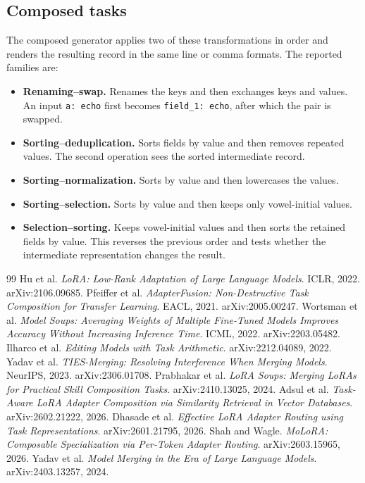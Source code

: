 \documentclass[10pt,twocolumn]{article}
\begin{document}
\subsection{Composed tasks}

The composed generator applies two of these transformations in order and renders the resulting record in the same line or comma formats. The reported families are:
\begin{itemize}
    \item \textbf{Renaming--swap.} Renames the keys and then exchanges keys and values. An input \texttt{a: echo} first becomes \texttt{field\_1: echo}, after which the pair is swapped.
    \item \textbf{Sorting--deduplication.} Sorts fields by value and then removes repeated values. The second operation sees the sorted intermediate record.
    \item \textbf{Sorting--normalization.} Sorts by value and then lowercases the values.
    \item \textbf{Sorting--selection.} Sorts by value and then keeps only vowel-initial values.
    \item \textbf{Selection--sorting.} Keeps vowel-initial values and then sorts the retained fields by value. This reverses the previous order and tests whether the intermediate representation changes the result.
\end{itemize}

\begin{thebibliography}{99}
\small
{} Hu et al. \emph{LoRA: Low-Rank Adaptation of Large Language Models}. ICLR, 2022. arXiv:2106.09685.
 Pfeiffer et al. \emph{AdapterFusion: Non-Destructive Task Composition for Transfer Learning}. EACL, 2021. arXiv:2005.00247.
 Wortsman et al. \emph{Model Soups: Averaging Weights of Multiple Fine-Tuned Models Improves Accuracy Without Increasing Inference Time}. ICML, 2022. arXiv:2203.05482.
 Ilharco et al. \emph{Editing Models with Task Arithmetic}. arXiv:2212.04089, 2022.
 Yadav et al. \emph{TIES-Merging: Resolving Interference When Merging Models}. NeurIPS, 2023. arXiv:2306.01708.
 Prabhakar et al. \emph{LoRA Soups: Merging LoRAs for Practical Skill Composition Tasks}. arXiv:2410.13025, 2024.
 Adsul et al. \emph{Task-Aware LoRA Adapter Composition via Similarity Retrieval in Vector Databases}. arXiv:2602.21222, 2026.
 Dhasade et al. \emph{Effective LoRA Adapter Routing using Task Representations}. arXiv:2601.21795, 2026.
 Shah and Wagle. \emph{MoLoRA: Composable Specialization via Per-Token Adapter Routing}. arXiv:2603.15965, 2026.
 Yadav et al. \emph{Model Merging in the Era of Large Language Models}. arXiv:2403.13257, 2024.
\end{thebibliography}
\end{document}
